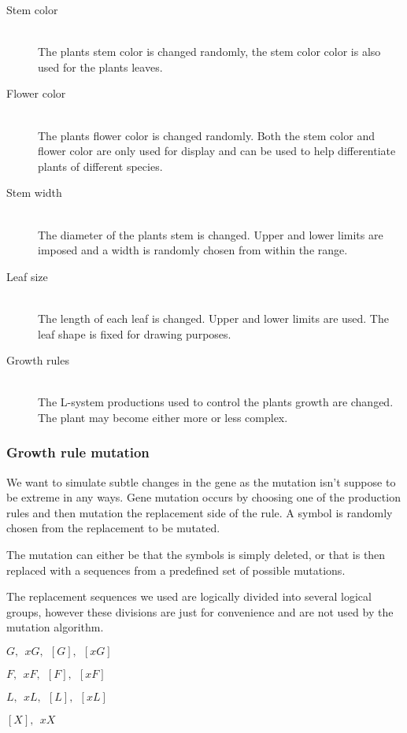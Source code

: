 \documentclass[conference]{acmsiggraph}
\begin{document}
\begin{description}
  \item[Stem color]   \hfill \\
    The plants stem color is changed randomly, the stem color color is also used
    for the plants leaves.
  \item[Flower color] \hfill \\
    The plants flower color is changed randomly. Both the stem color and flower
    color are only used for display and can be used to help differentiate plants
    of different species.
  \item[Stem width]   \hfill \\
    The diameter of the plants stem is changed. Upper and lower limits are
    imposed and a width is randomly chosen from within the range.
  \item[Leaf size]    \hfill \\
    The length of each leaf is changed. Upper and lower limits are used. The
    leaf shape is fixed for drawing purposes.
  \item[Growth rules] \hfill \\
    The L-system productions used to control the plants growth are changed. The
    plant may become either more or less complex.
\end{description}

\subsubsection{Growth rule mutation}

We want to simulate subtle changes in the gene as the mutation isn't suppose to
be extreme in any ways. Gene mutation occurs by choosing one of the production
rules and then mutation the replacement side of the rule. A symbol is randomly
chosen from the replacement to be mutated.

The mutation can either be that the symbols is simply deleted, or that is then
replaced with a sequences from a predefined set of possible mutations.

The replacement sequences we used are logically divided into several logical
groups, however these divisions are just for convenience and are not used by the
mutation algorithm.

\begin{description}[leftmargin=!,labelindent=0.2in,labelwidth=0.5in]
  \item[Stems]   $G,~~xG,~~[G],~~[xG]$
  \item[Flowers] $F,~~xF,~~[F],~~[xF]$
  \item[Leaves]  $L,~~xL,~~[L],~~[xL]$
  \item[Other]   $[X],~~xX$
\end{description}
\end{document}
